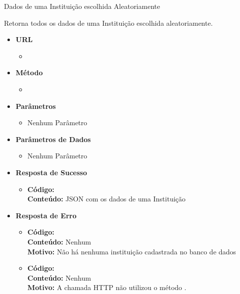 
\begin{caixa}{Dados de uma Instituição escolhida Aleatoriamente}{}

Retorna todos os dados de uma Instituição escolhida aleatoriamente.

\begin{itemize}
\item \textbf{URL}
	\begin{itemize}
		\item {}
	\end{itemize}

\item \textbf{Método}
	\begin{itemize}
		\item {}
	\end{itemize}

\item \textbf{Parâmetros}
	\begin{itemize}
		\item Nenhum Parâmetro
	\end{itemize}

\item \textbf{Parâmetros de Dados}
	\begin{itemize}
		\item Nenhum Parâmetro
	\end{itemize}

\item \textbf{Resposta de Sucesso}
	\begin{itemize}
		\item \textbf{Código:}  \\ \textbf{Conteúdo:} JSON com os dados de uma Instituição
	\end{itemize}

\item \textbf{Resposta de Erro}
	\begin{itemize}
		\item \textbf{Código:}  \\ \textbf{Conteúdo:} Nenhum \\ \textbf{Motivo:} Não há nenhuma instituição cadastrada no banco de dados
        \item \textbf{Código:}  \\ \textbf{Conteúdo:} Nenhum \\ \textbf{Motivo:} A chamada HTTP não utilizou o método .
	\end{itemize}

\end{itemize}
\end{caixa}

